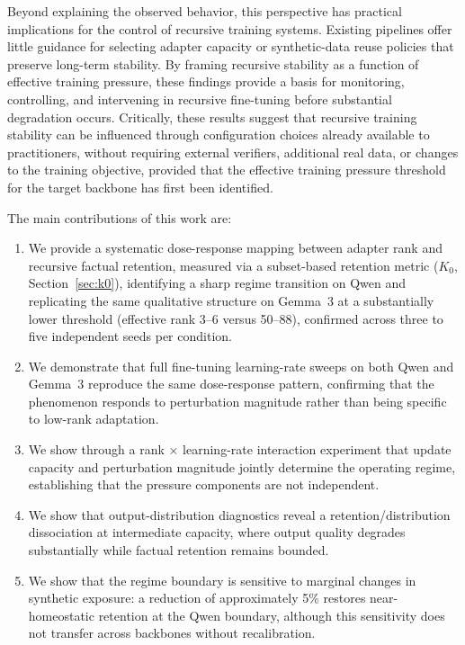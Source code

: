 \documentclass[a4paper,fleqn]{cas-dc}
\begin{document}
Beyond explaining the observed behavior, this perspective has practical
implications for the control of recursive training systems. Existing
pipelines offer little guidance for selecting adapter capacity or synthetic-data
reuse policies that preserve long-term stability. By framing recursive stability
as a function of effective training pressure, these findings provide a
basis for monitoring, controlling, and intervening in recursive fine-tuning
before substantial degradation occurs. Critically, these results suggest that
recursive training stability can be influenced through configuration choices
already available to practitioners, without requiring external verifiers,
additional real data, or changes to the training objective, provided that the
effective training pressure threshold for the target backbone has first been
identified.

The main contributions of this work are:
\begin{enumerate}
    \item We provide a systematic dose-response mapping between adapter rank and
    recursive factual retention, measured via a subset-based retention metric
    ($K_0$, Section~\ref{sec:k0}), identifying a sharp regime transition on Qwen
    and replicating the same qualitative structure on Gemma~3 at a
    substantially lower threshold (effective rank 3--6 versus 50--88),
    confirmed across three to five independent seeds per condition.
    \item We demonstrate that full fine-tuning learning-rate sweeps on both
    Qwen and Gemma~3 reproduce the same dose-response pattern, confirming that
    the phenomenon responds to perturbation magnitude rather than being
    specific to low-rank adaptation.
    \item We show through a rank $\times$ learning-rate interaction experiment
    that update capacity and perturbation magnitude jointly determine the
    operating regime, establishing that the pressure components are not
    independent.
    \item We show that output-distribution diagnostics reveal a
    retention/distribution dissociation at intermediate capacity, where output
    quality degrades substantially while factual retention remains bounded.
    \item We show that the regime boundary is sensitive to marginal changes
    in synthetic exposure: a reduction of approximately 5\% restores
    near-homeostatic retention at the Qwen boundary, although this sensitivity
    does not transfer across backbones without recalibration.
\end{enumerate}
\end{document}
